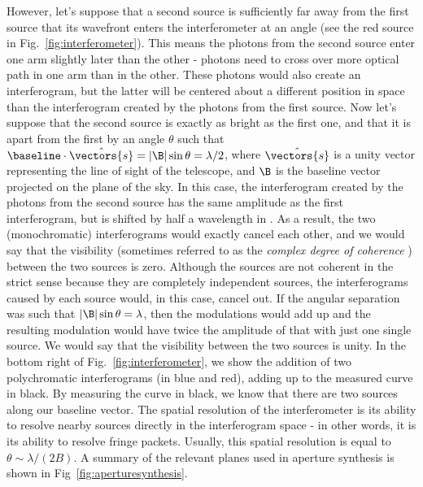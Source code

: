 However, let's suppose that a second source is sufficiently far away from the first source that its wavefront enters the interferometer at an angle (see the red source in Fig.~\ref{fig:interferometer}). This means the photons from the second source enter one arm slightly later than the other - photons need to cross over more optical path in one arm than in the other. These photons would also create an interferogram, but the latter will be centered about a different position in \OPD  space than the interferogram created by the photons from the first source. Now let's suppose that the second source is exactly as bright as the first one, and that it is apart from the first by an angle $\theta$ such that $\baseline\cdot\hat{\vectors{s}} = |\B|\sin\theta = \lambda/2$, where $\hat{\vectors{s}}$ is a unity vector representing the line of sight of the telescope, and $\B$ is the baseline vector projected on the plane of the sky. In this case, the interferogram created by the photons from the second source has the same amplitude as the first interferogram, but is shifted by half a wavelength in \OPD. As a result, the two (monochromatic) interferograms would exactly cancel each other, and we would say that the visibility (sometimes referred to as the \textit{complex degree of coherence} \citep[e.g.][]{Mariotti:1988vea}) between the two sources is zero. Although the sources are not coherent in the strict sense because they are completely independent sources, the interferograms caused by each source would, in this case, cancel out. If the angular separation was such that $|\B|\sin\theta = \lambda$, then the modulations would add up and the resulting modulation would have twice the amplitude of that with just one single source. We would say that the visibility between the two sources is unity. In the bottom right of Fig.~\ref{fig:interferometer}, we show the addition of two polychromatic interferograms (in blue and red), adding up to the measured curve in black. By measuring the curve in black, we know that there are two sources along our baseline vector. The spatial resolution of the interferometer is its ability to resolve nearby sources directly in the interferogram space - in other words, it is its ability to resolve fringe packets. Usually, this spatial resolution is equal to $\theta\sim\lambda/(2B)$. A summary of the relevant planes used in aperture synthesis is shown in Fig~\ref{fig:aperturesynthesis}.

